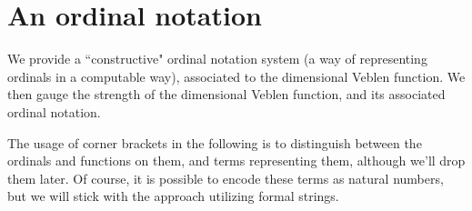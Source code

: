 \documentclass{article}
\theoremstyle{definition}
\theoremstyle{plain}
\theoremstyle{plain}
\theoremstyle{plain}
\theoremstyle{plain}
\theoremstyle{remark}
\theoremstyle{remark}
\theoremstyle{remark}
\theoremstyle{plain}
\theoremstyle{plain}
\begin{document}
\section{An ordinal notation}

We provide a ``constructive" ordinal notation system (a way of representing ordinals in a computable way), associated to the dimensional Veblen function. We then gauge the strength of the dimensional Veblen function, and its associated ordinal notation.

The usage of corner brackets in the following is to distinguish between the ordinals and functions on them, and terms representing them, although we'll drop them later. Of course, it is possible to encode these terms as natural numbers, but we will stick with the approach utilizing formal strings.
\end{document}
